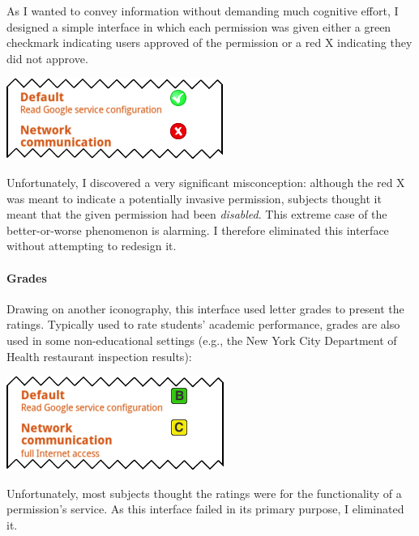 \documentclass[11pt]{article}
\begin{document}
As I wanted to convey information without demanding much cognitive effort,
I designed a simple interface in which 
each permission was given either a green 
checkmark indicating users approved of the permission or a red X indicating 
they did not approve.
\label{ss-sec-binary-r1}
\begin{center}
\includegraphics[width=.5\linewidth]{candidate-img/checkboxes/checkboxesR1.png}
\end{center}
Unfortunately, I discovered a very significant misconception:
although the red X was meant to indicate a potentially invasive permission, 
subjects thought it meant that the given permission had been \emph{disabled}. This
extreme case of the better-or-worse phenomenon is 
alarming. I therefore eliminated this interface without attempting to 
redesign it.

\paragraph{Grades}
\label{s-sec-grades}

Drawing on another iconography, this 
interface used letter grades to present the ratings. 
Typically used to rate students' academic performance, 
grades are also used in some non-educational settings (e.g., 
the New York City Department of Health restaurant 
inspection results):
\label{ss-sec-grades-r1}
\begin{center}
\includegraphics[width=.5\linewidth]{candidate-img/grades/gradesR1.png}
\end{center}
Unfortunately, most subjects thought the ratings were for 
the functionality of a permission's service. As this interface failed
in its primary purpose, I eliminated it.
\end{document}
